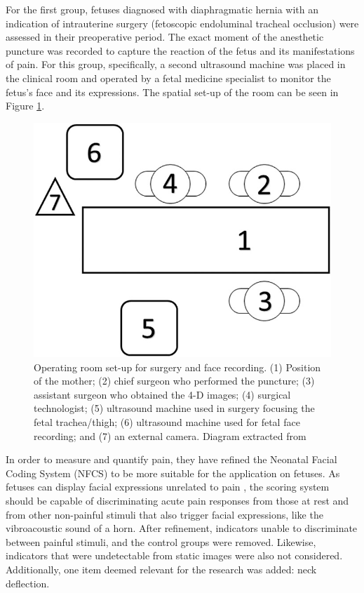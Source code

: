For the first group, fetuses diagnosed with diaphragmatic hernia with an indication of intrauterine surgery (fetoscopic endoluminal tracheal occlusion) were assessed in their preoperative period. The exact moment of the anesthetic puncture was recorded to capture the reaction of the fetus and its manifestations of pain. For this group, specifically, a second ultrasound machine was placed in the clinical room and operated by a fetal medicine specialist to monitor the fetus’s face and its expressions. The spatial set-up of the room can be seen in Figure \ref{fig:ultrasound}.

\begin{figure}[h!tp]
    \centering
    \includegraphics[width=.45\textwidth]{imgs/chap03_ultrasound_setup.jpg}
    \caption[Operating room set-up for surgery and face recording]{Operating room set-up for surgery and face recording. (1) Position of the mother; (2) chief surgeon who performed the puncture; (3) assistant surgeon who obtained the 4-D images; (4) surgical technologist; (5) ultrasound machine used in surgery focusing the fetal trachea/thigh; (6) ultrasound machine used for fetal face recording; and (7) an external camera. Diagram extracted from \citep{bernardes2018feasibility}}
    \label{fig:ultrasound}
\end{figure}

In order to measure and quantify pain, they have refined the Neonatal Facial Coding System (NFCS) to be more suitable for the application on fetuses. As fetuses can display facial expressions unrelated to pain \citep{Reissland2011}, the scoring system should be capable of discriminating acute pain responses from those at rest and from other non-painful stimuli that also trigger facial expressions, like the vibroacoustic sound of a horn. After refinement, indicators unable to discriminate between painful stimuli, and the control groups were removed. Likewise, indicators that were undetectable from static images were also not considered. Additionally, one item deemed relevant for the research was added: neck deflection.

